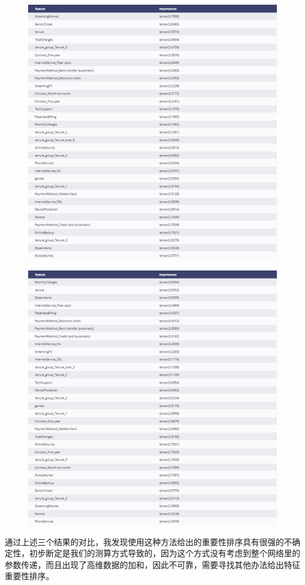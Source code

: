 \documentclass{article}
\begin{document}
\begin{figure}[H]
	\centering
	\includegraphics[width=\textwidth]{./img/mlp_res2.png}
\end{figure}

\begin{figure}[H]
	\centering
	\includegraphics[width=\textwidth]{./img/mlp_res3.png}
\end{figure}
通过上述三个结果的对比，我发现使用这种方法给出的重要性排序具有很强的不确定性，初步断定是我们的测算方式导致的，因为这个方式没有考虑到整个网络里的参数传递，而且出现了高维数据的加和，因此不可靠，需要寻找其他办法给出特征重要性排序。
\end{document}

